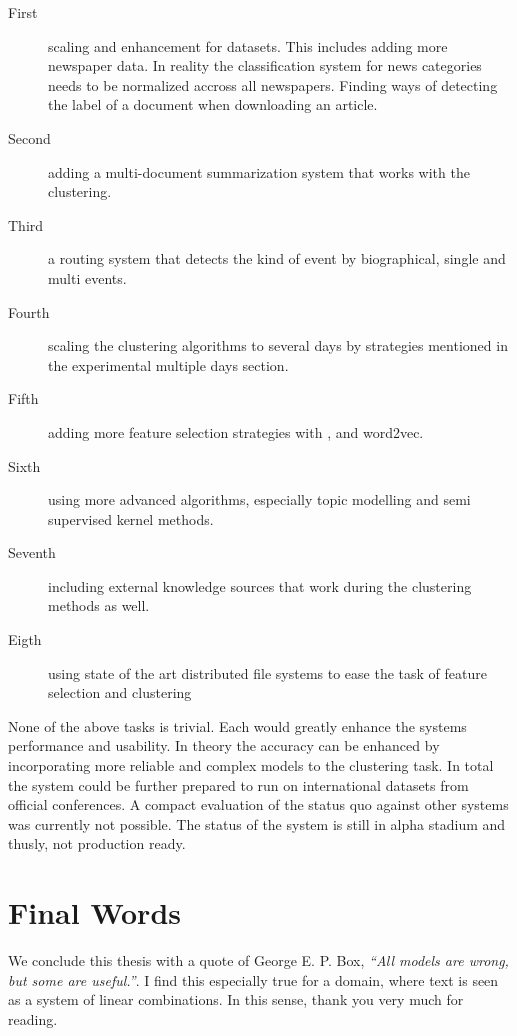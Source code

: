 \begin{description}
  \item[First] scaling and enhancement for datasets. This includes adding more newspaper data. In reality the classification system for news categories needs to be normalized accross all newspapers. Finding ways of detecting the label of a document when downloading an article.
  \item[Second] adding a multi-document summarization system that works with the clustering.
  \item[Third] a routing system that detects the kind of event by biographical, single and multi events.
  \item[Fourth] scaling the clustering algorithms to several days by strategies mentioned in the experimental multiple days section.
  \item[Fifth] adding more feature selection strategies with \wordnet{}, \wiki{} and word2vec.
  \item[Sixth] using more advanced algorithms, especially topic modelling and semi supervised kernel methods.
  \item[Seventh] including external knowledge sources that work during the clustering methods as well.
  \item[Eigth] using state of the art distributed file systems to ease the task of feature selection and clustering
\end{description}

None of the above tasks is trivial. Each would greatly enhance the systems performance and usability. In theory the accuracy can be enhanced by incorporating more reliable and complex models to the clustering task. In total the system could be further prepared to run on international datasets from official conferences. A compact evaluation of the status quo against other systems was currently not possible. The status of the system is still in alpha stadium and thusly, not production ready.

\section{Final Words}

We conclude this thesis with a quote of George E. P. Box, \emph{``All models are wrong, but some are useful.''}. I find this especially true for a domain, where text is seen as a system of linear combinations. In this sense, thank you very much for reading.

